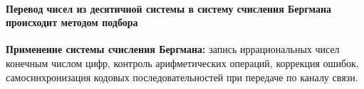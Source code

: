 \paragraph{Перевод чисел из десятичной системы в систему счисления Бергмана происходит методом подбора}
\textbf{Применение системы счисления Бергмана:} запись иррациональных чисел конечным числом цифр, контроль арифметических операций, коррекция ошибок, самосинхронизация кодовых последовательностей при передаче по каналу связи.
